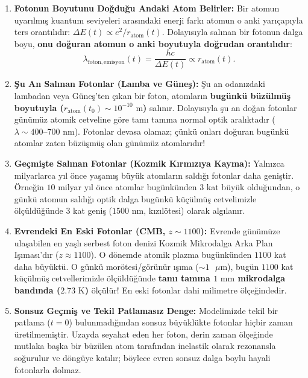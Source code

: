 \documentclass[11pt,a4paper]{article}
\begin{document}
\begin{enumerate}
    \item \textbf{Fotonun Boyutunu Doğduğu Andaki Atom Belirler:}
          Bir atomun uyarılmış kuantum seviyeleri arasındaki enerji farkı atomun o anki yarıçapıyla ters orantılıdır: $\Delta E(t) \propto e^2 / r_{\mathrm{atom}}(t)$. Dolayısıyla salınan bir fotonun dalga boyu, \textbf{onu doğuran atomun o anki boyutuyla doğrudan orantılıdır}:
          \begin{equation}
              \lambda_{\mathrm{foton, emisyon}}(t) = \frac{h c}{\Delta E(t)} \propto r_{\mathrm{atom}}(t).
          \end{equation}
    \item \textbf{Şu An Salınan Fotonlar (Lamba ve Güneş):}
          Şu an odanızdaki lambadan veya Güneş'ten çıkan bir foton, atomların \textbf{bugünkü büzülmüş boyutuyla ($r_{\mathrm{atom}}(t_0) \sim 10^{-10}\text{ m}$)} salınır. Dolayısıyla şu an doğan fotonlar günümüz atomik cetveline göre tamı tamına normal optik aralıktadır ($\lambda \sim 400\text{--}700\text{ nm}$). Fotonlar devasa olamaz; çünkü onları doğuran bugünkü atomlar zaten büzüşmüş olan günümüz atomlarıdır!
    \item \textbf{Geçmişte Salınan Fotonlar (Kozmik Kırmızıya Kayma):}
          Yalnızca milyarlarca yıl önce yaşamış büyük atomların saldığı fotonlar daha geniştir. Örneğin $10$ milyar yıl önce atomlar bugünkünden $3$ kat büyük olduğundan, o günkü atomun saldığı optik dalga bugünkü küçülmüş cetvelimizle ölçüldüğünde $3$ kat geniş ($1500\text{ nm}$, kızılötesi) olarak algılanır.
    \item \textbf{Evrendeki En Eski Fotonlar (CMB, $z \sim 1100$):}
          Evrende günümüze ulaşabilen en yaşlı serbest foton denizi Kozmik Mikrodalga Arka Plan Işıması'dır ($z \approx 1100$). O dönemde atomik plazma bugünkünden $1100$ kat daha büyüktü. O günkü morötesi/görünür ışıma ($\sim 1\text{ }\mu\mathrm{m}$), bugün $1100$ kat küçülmüş cetvellerimizle ölçüldüğünde \textbf{tamı tamına $1\text{ mm}$ mikrodalga bandında ($2.73\text{ K}$)} ölçülür! En eski fotonlar dahi milimetre ölçeğindedir.
    \item \textbf{Sonsuz Geçmiş ve Tekil Patlamasız Denge:}
          Modelimizde tekil bir patlama ($t=0$) bulunmadığından sonsuz büyüklükte fotonlar hiçbir zaman üretilmemiştir. Uzayda seyahat eden her foton, derin zaman ölçeğinde mutlaka başka bir büzülen atom tarafından inelastik olarak rezonansla soğurulur ve döngüye katılır; böylece evren sonsuz dalga boylu hayali fotonlarla dolmaz.
\end{enumerate}
\end{document}
